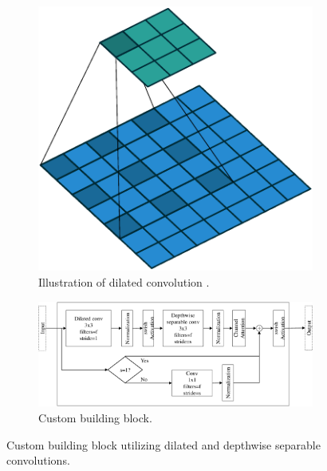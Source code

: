 \begin{figure}[htb!]
	\centering
	\begin{subfigure}[b]{0.5\textwidth}
		\centering
		\includegraphics[width=\textwidth,keepaspectratio]{images/ongoing/dilation_00-cropped.pdf}
		\caption{Illustration of dilated convolution \cite{DilatedConv2D}.}
		\label{fig:dilated}
	\end{subfigure}
	\hfill
	\begin{subfigure}[b]{\textwidth}
		\centering
		\includegraphics[width=\textwidth,keepaspectratio]{images/ongoing/Dilated_block-cropped.pdf}
		\caption{Custom building block.}
		\label{fig:dilated_custom_block}
	\end{subfigure}
	
	\caption{Custom building block utilizing dilated and depthwise separable convolutions.}
	\label{fig:cust_block_dilated}
\end{figure}

